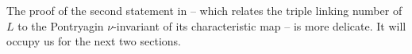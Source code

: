 The proof of the second statement in  -- which relates the triple linking number of $L$ to the Pontryagin $\nu$-invariant of its characteristic map -- is more delicate.  It will occupy us for the next two sections.

